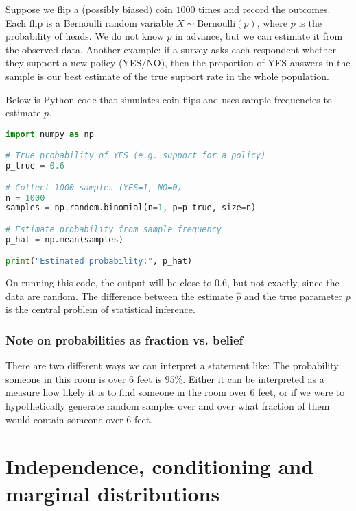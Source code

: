 \begin{example}
Suppose we flip a (possibly biased) coin $1000$ times and record the outcomes. 
Each flip is a Bernoulli random variable $X \sim \text{Bernoulli}(p)$, where $p$ is the probability of heads. 
We do not know $p$ in advance, but we can estimate it from the observed data. Another example:  if a survey asks each respondent whether they support a new policy (YES/NO), then the proportion of YES answers in the sample is our best estimate of the true support rate in the whole population. 



Below is Python code that simulates coin flips and uses sample frequencies to estimate $p$.
\begin{lstlisting}[language=Python]
import numpy as np

# True probability of YES (e.g. support for a policy)
p_true = 0.6

# Collect 1000 samples (YES=1, NO=0)
n = 1000
samples = np.random.binomial(n=1, p=p_true, size=n)

# Estimate probability from sample frequency
p_hat = np.mean(samples)

print("Estimated probability:", p_hat)
\end{lstlisting}

On running this code, the output will be close to $0.6$, but not exactly, 
since the data are random. 
The difference between the estimate $\hat{p}$ and the true parameter $p$ 
is the central problem of statistical inference.
\end{example}


\subsubsection*{Note on probabilities as fraction vs. belief}
There are two different ways we can interpret a statement like: The probability someone in this room is over $6$ feet is $95\%$. Either it can be interpreted as a measure how likely it is to find someone in the room over $6$ feet, or if we were to hypothetically generate random samples over and over what fraction of them would contain someone over $6$ feet. 




\section{Independence, conditioning and marginal distributions }

